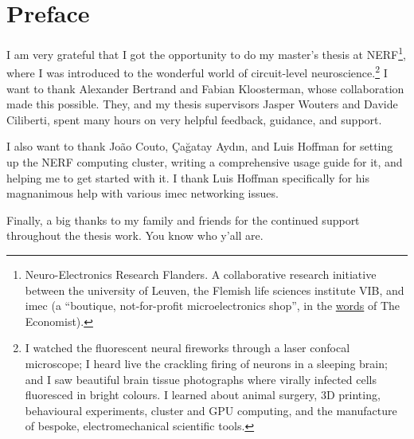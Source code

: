 \chapter*{Preface}
\label{sec:preface}


I am very grateful that I got the opportunity to do my master's thesis at NERF\footnote{Neuro-Electronics Research Flanders. A collaborative research initiative between the university of Leuven, the Flemish life sciences institute VIB, and imec (a ``boutique, not-for-profit microelectronics shop'', in the \href{https://www.economist.com/science-and-technology/2017/11/09/a-new-nerve-cell-monitor-will-help-those-studying-brains}{words} of The Economist).}, where I was introduced to the wonderful world of circuit-level neuroscience.\footnote{I watched the fluorescent neural fireworks through a laser confocal microscope; I heard live the crackling firing of neurons in a sleeping brain; and I saw beautiful brain tissue photographs where virally infected cells fluoresced in bright colours. I learned about animal surgery, 3D printing, behavioural experiments, cluster and GPU computing, and the manufacture of bespoke, electromechanical scientific tools.}
I want to thank Alexander Bertrand and Fabian Kloosterman, whose collaboration made this possible. They, and my thesis supervisors Jasper Wouters and Davide Ciliberti, spent many hours on very helpful feedback, guidance, and support.

I also want to thank Jo\~ao Couto, \c{C}a\u{g}atay Ayd{\i}n, and Luis Hoffman for setting up the NERF computing cluster, writing a comprehensive usage guide for it, and helping me to get started with it. I thank Luis Hoffman specifically for his magnanimous help with various imec networking issues.

Finally, a big thanks to my family and friends for the continued support throughout the thesis work. You know who y'all are.


